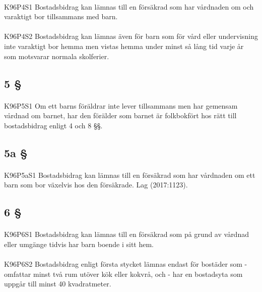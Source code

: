 \documentclass[a4paper,notitlepage,openany,10pt]{book}
\begin{document}
\paragraph*{}
{\tiny K96P4S1}
Bostadsbidrag kan lämnas till en försäkrad som har vårdnaden om och varaktigt bor tillsammans med barn.
\paragraph*{}
{\tiny K96P4S2}
Bostadsbidrag kan lämnas även för barn som för vård eller undervisning inte varaktigt bor hemma men vistas hemma under minst så lång tid varje år som motsvarar normala skolferier.
\subsection*{5 §}
\paragraph*{}
{\tiny K96P5S1}
Om ett barns föräldrar inte lever tillsammans men har gemensam vårdnad om barnet, har den förälder som barnet är folkbokfört hos rätt till bostadsbidrag enligt 4 och 8 §§.
\subsection*{5a §}
\paragraph*{}
{\tiny K96P5aS1}
Bostadsbidrag kan lämnas till en försäkrad som har vårdnaden om ett barn som bor växelvis hos den försäkrade.
Lag (2017:1123).
\subsection*{6 §}
\paragraph*{}
{\tiny K96P6S1}
Bostadsbidrag kan lämnas till en försäkrad som på grund av vårdnad eller umgänge tidvis har barn boende i sitt hem.
\paragraph*{}
{\tiny K96P6S2}
Bostadsbidrag enligt första stycket lämnas endast för bostäder som
\newline - omfattar minst två rum utöver kök eller kokvrå, och
\newline - har en bostadsyta som uppgår till minst 40 kvadratmeter.
\end{document}
